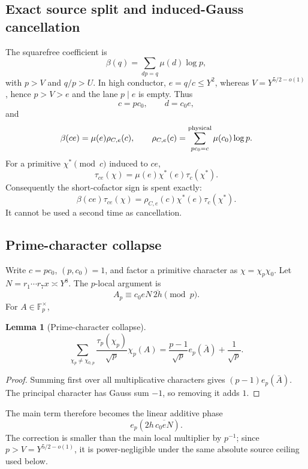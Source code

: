\documentclass[11pt]{article}
\newtheorem{lemma}[lemma]{Lemma}
\theoremstyle{definition}
\newcommand{\1}{\mathbf 1}
\begin{document}
\subsection{Exact source split and induced-Gauss cancellation}
The squarefree coefficient is
\[
 \beta(q)=\sum_{dp=q}\mu(d)\log p,
\]
with $p>V$ and $q/p>U$.  In high conductor, $e=q/c\le Y^2$, whereas
$V=Y^{5/2-o(1)}$, hence $p>V>e$ and the lane $p\mid e$ is empty.  Thus
\[
   c=pc_0,\qquad d=c_0e,
\]
and
\begin{equation}
   \beta(ce)=\mu(e)\rho_{C,e}(c),
   \qquad
   \rho_{C,e}(c)=
   \sum_{pc_0=c}^{\rm physical}\mu(c_0)\log p.
   \label{eq:beta-C}
\end{equation}
For a primitive $\chi^\ast\pmod c$ induced to $ce$,
\begin{equation}
   \tau_{ce}(\chi)=\mu(e)\chi^\ast(e)\tau_c(\chi^\ast).
   \label{eq:induced-gauss2}
\end{equation}
Consequently the short-cofactor sign is spent exactly:
\[
   \beta(ce)\tau_{ce}(\chi)
   =\rho_{C,e}(c)\chi^\ast(e)\tau_c(\chi^\ast).
\]
It cannot be used a second time as cancellation.

\subsection{Prime-character collapse}
Write $c=pc_0$, $(p,c_0)=1$, and factor a primitive character as
$\chi=\chi_p\chi_0$.  Let
$N=r_1\cdots r_7x\asymp Y^8$.  The $p$-local argument is
\[
   A_p\equiv c_0eN\,\overline{2h}\pmod p.
\]
For $A\in\mathbb F_p^\times$,
\begin{lemma}[Prime-character collapse]
\label{lem:prime-collapse}
\[
 \sum_{\chi_p\ne\chi_{0,p}}
   \frac{\tau_p(\chi_p)}{\sqrt p}\chi_p(A)
 =\frac{p-1}{\sqrt p}e_p(\bar A)+\frac1{\sqrt p}.
\]
\end{lemma}
\begin{proof}
Summing first over all multiplicative characters gives
$(p-1)e_p(\bar A)$.  The principal character has Gauss sum $-1$, so removing
it adds $1$.
\end{proof}
The main term therefore becomes the linear additive phase
\[
   e_p\!\left(2h\,\overline{c_0eN}\right).
\]
The correction is smaller than the main local multiplier by $p^{-1}$; since
$p>V=Y^{5/2-o(1)}$, it is power-negligible under the same absolute source
ceiling used below.
\end{document}

